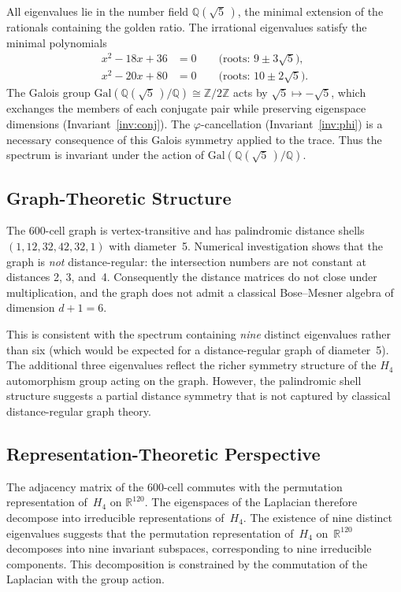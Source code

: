 \documentclass[12pt,a4paper]{article}
\newcommand{\Hfour}{H_4}
\newcommand{\vphi}{\varphi}
\newcommand{\R}{\mathbb{R}}
\newcommand{\Q}{\mathbb{Q}}
\newcommand{\Z}{\mathbb{Z}}
\begin{document}
All eigenvalues lie in the number field $\Q(\sqrt{5}\,)$, the minimal
extension of the rationals containing the golden ratio.  The irrational
eigenvalues satisfy the minimal polynomials
\begin{align}
  x^2 - 18x + 36 &= 0 \qquad \text{(roots: } 9 \pm 3\sqrt{5}\text{)},
    \label{eq:minpoly1} \\
  x^2 - 20x + 80 &= 0 \qquad \text{(roots: } 10 \pm 2\sqrt{5}\text{)}.
    \label{eq:minpoly2}
\end{align}
The Galois group $\mathrm{Gal}(\Q(\sqrt{5}\,)/\Q) \cong \Z/2\Z$
acts by $\sqrt{5} \mapsto -\sqrt{5}$, which exchanges the members of
each conjugate pair while preserving eigenspace dimensions
(Invariant~\ref{inv:conj}).  The $\vphi$-cancellation
(Invariant~\ref{inv:phi}) is a necessary consequence of this Galois
symmetry applied to the trace.  Thus the spectrum is invariant under
the action of $\mathrm{Gal}(\Q(\sqrt{5}\,)/\Q)$.

\subsection{Graph-Theoretic Structure}

The 600-cell graph is vertex-transitive and has palindromic distance
shells $(1, 12, 32, 42, 32, 1)$ with diameter~5.  Numerical
investigation shows that the graph is \emph{not} distance-regular:
the intersection numbers are not constant at distances 2, 3, and~4.
Consequently the distance matrices do not close under multiplication,
and the graph does not admit a classical Bose--Mesner algebra of
dimension $d+1 = 6$.

This is consistent with the spectrum containing \emph{nine} distinct
eigenvalues rather than six (which would be expected for a
distance-regular graph of diameter~5).  The additional three eigenvalues
reflect the richer symmetry structure of the $\Hfour$ automorphism
group acting on the graph.  However, the palindromic shell structure
suggests a partial distance symmetry that is not captured by classical
distance-regular graph theory.

\subsection{Representation-Theoretic Perspective}

The adjacency matrix of the 600-cell commutes with the permutation
representation of~$\Hfour$ on $\R^{120}$.  The eigenspaces of the
Laplacian therefore decompose into irreducible representations
of~$\Hfour$.  The existence of nine distinct eigenvalues suggests that the
permutation representation of~$\Hfour$ on~$\R^{120}$ decomposes into
nine invariant subspaces, corresponding to nine irreducible components.
This decomposition is constrained by the commutation of the Laplacian
with the group action.
\end{document}
